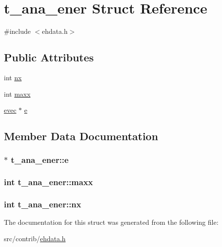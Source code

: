 \hypertarget{structt__ana__ener}{\section{t\-\_\-ana\-\_\-ener \-Struct \-Reference}
\label{structt__ana__ener}
}


{\ttfamily \#include $<$ehdata.\-h$>$}

\subsection*{\-Public \-Attributes}
\begin{DoxyCompactItemize}
\item 
int \hyperlink{structt__ana__ener_a7a29a0dfa48b8bb2e138c2290dc62978}{nx}
\item 
int \hyperlink{structt__ana__ener_aec5f31543b2440654800a1eac1c4f75e}{maxx}
\item 
\hyperlink{ehdata_8h_aebbbd5bd9fb5d43a7cfb66fffc0565ba}{evec} $\ast$ \hyperlink{structt__ana__ener_a9a5bc9f1ffe842d3a5469c2ffc3183a1}{e}
\end{DoxyCompactItemize}


\subsection{\-Member \-Data \-Documentation}
\hypertarget{structt__ana__ener_a9a5bc9f1ffe842d3a5469c2ffc3183a1}{
\subsubsection[{e}]{$\ast$ {\bf t\-\_\-ana\-\_\-ener\-::e}}}\label{structt__ana__ener_a9a5bc9f1ffe842d3a5469c2ffc3183a1}
\hypertarget{structt__ana__ener_aec5f31543b2440654800a1eac1c4f75e}{
\subsubsection[{maxx}]{\setlength{\rightskip}{0pt plus 5cm}int {\bf t\-\_\-ana\-\_\-ener\-::maxx}}}\label{structt__ana__ener_aec5f31543b2440654800a1eac1c4f75e}
\hypertarget{structt__ana__ener_a7a29a0dfa48b8bb2e138c2290dc62978}{
\subsubsection[{nx}]{\setlength{\rightskip}{0pt plus 5cm}int {\bf t\-\_\-ana\-\_\-ener\-::nx}}}\label{structt__ana__ener_a7a29a0dfa48b8bb2e138c2290dc62978}


\-The documentation for this struct was generated from the following file\-:\begin{DoxyCompactItemize}
\item 
src/contrib/\hyperlink{ehdata_8h}{ehdata.\-h}\end{DoxyCompactItemize}
